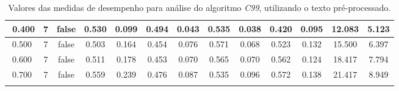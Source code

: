 \begin{longtable}[c]{|c|c|c|c|c|c|c|c|c|c|c|c|c|}
$$  0.400 & 7 & false & 0.530 & 0.099 & 0.494 & 0.043 & 0.535 & 0.038 & 0.420 & 0.095 & 12.083 & 5.123  \\ \hline 
  0.500 & 7 & false & 0.503 & 0.164 & 0.454 & 0.076 & 0.571 & 0.068 & 0.523 & 0.132 & 15.500 & 6.397  \\ \hline 
  0.600 & 7 & false & 0.511 & 0.178 & 0.453 & 0.070 & 0.565 & 0.070 & 0.562 & 0.124 & 18.417 & 7.794  \\ \hline 
  0.700 & 7 & false & 0.559 & 0.239 & 0.476 & 0.087 & 0.535 & 0.096 & 0.572 & 0.138 & 21.417 & 8.949  \\ \hline 
 \caption{Valores das medidas de desempenho para análise do algoritmo \textit{C99}, utilizando o texto pré-processado.}
 \end{longtable} 



